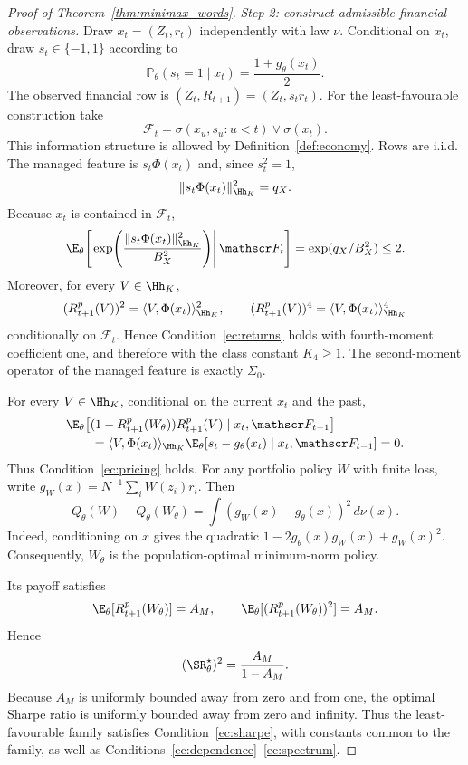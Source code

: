 \begin{proof}[Proof of Theorem~\ref{thm:minimax_words}]
\medskip
\noindent\textit{Step 2: construct admissible financial observations.}
Draw $x_t=(Z_t,r_t)$ independently with law $\nu$. Conditional on $x_t$,
draw $s_t\in\{-1,1\}$ according to
\[
\mathbb P_\theta(s_t=1\mid x_t)
=
\frac{1+g_\theta(x_t)}{2}.
\]
The observed financial row is
$(Z_t,R_{t+1})=(Z_t,s_tr_t)$. For the least-favourable construction take
\[
\mathscr F_t
=
\sigma(x_u,s_u:u<t)\vee\sigma(x_t).
\]
This information structure is allowed by Definition~\ref{def:economy}.
Rows are i.i.d. The managed feature is $s_t\Phi(x_t)$ and, since
$s_t^2=1$,
\[
\|s_t\Phi(x_t)\|_{\Hh_K}^2=q_X.
\]
Because $x_t$ is contained in $\mathscr F_t$,
\[
\E_\theta\!\left[
\left.
\exp\!\left(
\frac{\|s_t\Phi(x_t)\|_{\Hh_K}^2}{B_X^2}
\right)
\right|\mathscr F_t
\right]
=
\exp(q_X/B_X^2)
\leq2.
\]
Moreover, for every $V\in\Hh_K$,
\[
(R^p_{t+1}(V))^2=\langle V,\Phi(x_t)\rangle_{\Hh_K}^2,
\qquad
(R^p_{t+1}(V))^4=\langle V,\Phi(x_t)\rangle_{\Hh_K}^4
\]
conditionally on $\mathscr F_t$. Hence
Condition~\ref{ec:returns} holds with fourth-moment coefficient one,
and therefore with the class constant $K_4\geq1$.
The second-moment operator of the managed feature is exactly $\Sigma_0$.

For every $V\in\Hh_K$, conditional on the current $x_t$ and the past,
\[
\begin{aligned}
&\E_\theta\!\left[
(1-R^p_{t+1}(W_\theta))R^p_{t+1}(V)
\mid x_t,\mathscr F_{t-1}
\right]\\
&\qquad=
\langle V,\Phi(x_t)\rangle_{\Hh_K}
\E_\theta[s_t-g_\theta(x_t)\mid x_t,\mathscr F_{t-1}]
=0.
\end{aligned}
\]
Thus Condition~\ref{ec:pricing} holds. For any portfolio policy $W$ with
finite loss, write $g_W(x)=N^{-1}\sum_iW(z_i)r_i$. Then
\begin{equation}
Q_\theta(W)-Q_\theta(W_\theta)
=
\int(g_W(x)-g_\theta(x))^2\,d\nu(x).
\label{eq:lower_risk_identity}
\end{equation}
Indeed, conditioning on $x$ gives the quadratic
$1-2g_\theta(x)g_W(x)+g_W(x)^2$. Consequently, $W_\theta$ is the
population-optimal minimum-norm policy.

Its payoff satisfies
\[
\E_\theta[R^p_{t+1}(W_\theta)]=A_M,
\qquad
\E_\theta[(R^p_{t+1}(W_\theta))^2]=A_M.
\]
Hence
\[
(\SR_\theta^\star)^2
=
\frac{A_M}{1-A_M}.
\]
Because $A_M$ is uniformly bounded away from zero and from one, the optimal
Sharpe ratio is uniformly bounded away from zero and infinity. Thus the
least-favourable family satisfies Condition~\ref{ec:sharpe}, with constants
common to the family, as well as Conditions~\ref{ec:dependence}--\ref{ec:spectrum}.


\end{proof}
